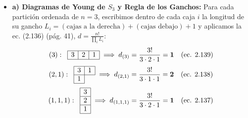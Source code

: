 \documentclass[11pt, a4paper]{article}
\begin{document}
\begin{itemize}
    \item \textbf{a) Diagramas de Young de $S_3$ y Regla de los Ganchos:}
    Para cada partición ordenada de $n = 3$, escribimos dentro de cada caja $i$ la longitud de su gancho $L_i = (\text{cajas a la derecha}) + (\text{cajas debajo}) + 1$ y aplicamos la ec. (2.136) (pág. 41), $d = \frac{n!}{\prod_i L_i}$:
    \[
    (3): \;\; \begin{array}{|c|c|c|} \hline 3 & 2 & 1 \\ \hline \end{array} \implies d_{(3)} = \frac{3!}{3 \cdot 2 \cdot 1} = \mathbf{1} \quad \text{(ec. 2.139)}
    \]
    \[
    (2,1): \;\; \begin{array}{|c|c|} \hline 3 & 1 \\ \hline 1 & \multicolumn{1}{c}{} \\ \cline{1-1} \end{array} \implies d_{(2,1)} = \frac{3!}{3 \cdot 1 \cdot 1} = \mathbf{2} \quad \text{(ec. 2.138)}
    \]
    \[
    (1,1,1): \;\; \begin{array}{|c|} \hline 3 \\ \hline 2 \\ \hline 1 \\ \hline \end{array} \implies d_{(1,1,1)} = \frac{3!}{3 \cdot 2 \cdot 1} = \mathbf{1} \quad \text{(ec. 2.137)}
    \]


\end{itemize}
\end{document}
